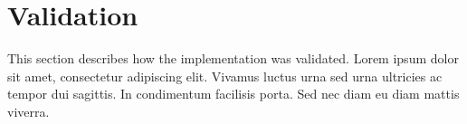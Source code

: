 \section{Validation}
This section describes how the implementation was validated. Lorem ipsum dolor sit amet, 
consectetur adipiscing elit. Vivamus luctus urna sed urna ultricies ac tempor dui sagittis. 
In condimentum facilisis porta. Sed nec diam eu diam mattis viverra.
